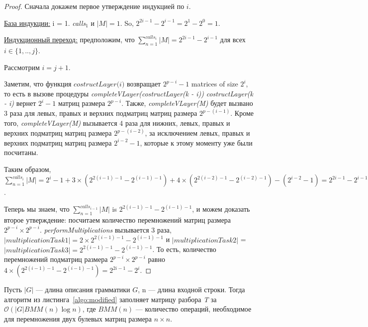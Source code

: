 \documentclass[14pt]{matmex-diploma-custom}
\begin{document}
\begin{proof}

Сначала докажем первое утверждение индукцией по $i$.

\underline{База индукции:} i = 1. \textit{calls$_{1}$} и $|M| = 1$. So, $2^{2i - 1} - 2^{i - 1} = 2^1 - 2^0 = 1$.

\underline{Индукционный переход:} предположим, что $\sum_{n=1}^{calls_i}{|M|} = 2^{2i - 1} - 2^{i - 1}$ для всех $i \in \{ 1, .., j\}$.

Рассмотрим $i = j + 1$.

Заметим, что функция $\textit{costructLayer(i)}$ возвращает $2^{p - i} - 1$ matrices of size $2^i$, то есть в вызове процедуры \textit{completeVLayer(costructLayer(k - i))}  \textit{costructLayer(k - i)} вернет $2^i - 1$ матриц размера $2^{p - i}$. 
Также, \textit{completeVLayer(M)} будет вызвано 3 раза для левых, правых и верхних подматриц матриц размера $2^{p - (i - 1)}$. Кроме того, \textit{completeVLayer(M)} вызывается 4 раза для нижних, левых, правых и верхних подматриц матриц размера $2^{p - (i - 2)}$, за исключением левых, правых и верхних подматриц матриц размера $2^{i - 2} - 1$, которые к этому моменту уже были посчитаны.

Таким образом, $\sum_{n=1}^{calls_i}{|M|} = 2^{i} - 1 + 3 \times (2^{2(i - 1) - 1} - 2^{(i - 1) - 1}) + 4 \times (2^{2(i - 2) - 1} - 2^{(i - 2) - 1}) - (2^{i - 2} - 1) = 2^{2i - 1} - 2^{i - 1}$.

Теперь мы знаем, что $\sum_{n=1}^{calls_{i-1}}{|M|}$  is $2^{2(i - 1) - 1} - 2^{(i - 1) - 1}$, и можем доказать второе утверждение: посчитаем количество перемножений матриц размера $2^{p - i} \times 2^{p - i}$. 
\textit{performMultiplications} вызывается 3 раза, $|multiplicationTask1| = 2 \times 2^{2(i - 1) - 1} - 2^{(i - 1) - 1}$ и $|multiplicationTask2|$ = $|multiplicationTask3| = 2^{2(i - 1) - 1} - 2^{(i - 1) - 1}$. То есть, количество перемножений подматриц размера $2^{p - i} \times 2^{p - i}$ равно $ 4 \times (2^{2(i - 1) - 1} - 2^{(i - 1) - 1}) = 2^{2i - 1} - 2^{i}$.
\end{proof}

\begin{theorem}
Пусть $|G|$ --- длина описания грамматики $G$, n --- длина входной строки. Тогда алгоритм из листинга~\ref{algo:modified} заполняет матрицу разбора \textit{T} за $\mathcal{O}(|G|BMM(n)\log{n})$, где $BMM(n)$ --- количество операций, необходимое для перемножения двух булевых матриц размера $n \times n$.
\end{theorem}
\end{document}
